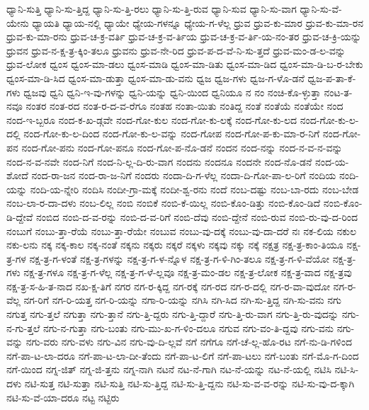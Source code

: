 {ಧ್ಯಾನಿ-ಸುತ್ತಿ
ಧ್ಯಾನಿ-ಸು-ತ್ತಿದ್ದ
ಧ್ಯಾನಿ-ಸು-ತ್ತಿ-ರಲು
ಧ್ಯಾನಿ-ಸು-ತ್ತಿ-ರುವ
ಧ್ಯಾನಿ-ಸುವ
ಧ್ಯಾನಿ-ಸು-ವಾಗ
ಧ್ಯಾನಿ-ಸು-ವೆ-ಯೇನು
ಧ್ಯಾಯತಿ
ಧ್ಯಾಯ-ನಲ್ಲಿ
ಧ್ಯಾಯೇ
ಧ್ಯೇಯ-ಗಳನ್ನೂ
ಧ್ಯೇಯ-ಗ-ಳೆಲ್ಲ
ಧ್ರುವ
ಧ್ರುವ-ಕು-ಮಾರ
ಧ್ರುವ-ಕು-ಮಾ-ರನ
ಧ್ರುವ-ಕು-ಮಾ-ರನು
ಧ್ರುವ-ಚ-ಕ್ರ-ವರ್ತಿ
ಧ್ರುವ-ಚ-ಕ್ರ-ವ-ರ್ತಿಯ
ಧ್ರುವ-ಚ-ಕ್ರ-ವ-ರ್ತಿ-ಯ-ನಂ-ತರ
ಧ್ರುವ-ಚ-ಕ್ರಿ-ಯನ್ನು
ಧ್ರುವನ
ಧ್ರುವ-ನ-ಕ್ಷ-ತ್ರ-ಕ್ಕಿಂ-ತಲೂ
ಧ್ರುವನು
ಧ್ರುವ-ನೇ-ರಿದ
ಧ್ರುವ-ಪ-ದ-ವೆ-ನಿ-ಸು-ತ್ತದೆ
ಧ್ರುವ-ಮಂ-ಡ-ಲ-ವನ್ನು
ಧ್ರುವ-ಲೋಕ
ಧ್ವಂಸ
ಧ್ವಂಸ-ಮಾ-ಡಲು
ಧ್ವಂಸ-ಮಾಡಿ
ಧ್ವಂಸ-ಮಾ-ಡಿತು
ಧ್ವಂಸ-ಮಾ-ಡಿದ
ಧ್ವಂಸ-ಮಾ-ಡಿ-ಬ-ರ-ಬೇಕು
ಧ್ವಂಸ-ಮಾ-ಡಿ-ಸಿದ
ಧ್ವಂಸ-ಮಾ-ಡುತ್ತಾ
ಧ್ವಂಸ-ಮಾ-ಡು-ವನು
ಧ್ವಜ
ಧ್ವಜ-ಗಳು
ಧ್ವಜ-ಗ-ಳೊ-ಡನೆ
ಧ್ವಜ-ಪ-ತಾ-ಕೆ-ಗಳು
ಧ್ವಜವು
ಧ್ವನಿ
ಧ್ವನಿ-ಇ-ವು-ಗಳನ್ನು
ಧ್ವನಿ-ಯನ್ನು
ಧ್ವನಿ-ಯಿಂದ
ಧ್ವನಿಯೂ
ನ
ನಂ
ನಂಚಿ-ಕೊ-ಳ್ಳುತ್ತಾ
ನಂಟ-ತ-ನವೂ
ನಂತರ
ನಂತ-ರದ
ನಂತ-ರ-ದ-ವ-ರೆಗೂ
ನಂತಹ
ನಂತಾ-ಯಿತು
ನಂತಿದ್ದ
ನಂತೆ
ನಂತೆಯೆ
ನಂತೆಯೇ
ನಂದ
ನಂದ-ಇ-ಬ್ಬರೂ
ನಂದ-ಕ-ಖ-ಡ್ಗವೇ
ನಂದ-ಗೋ-ಕುಲ
ನಂದ-ಗೋ-ಕು-ಲಕ್ಕೆ
ನಂದ-ಗೋ-ಕು-ಲದ
ನಂದ-ಗೋ-ಕು-ಲ-ದಲ್ಲಿ
ನಂದ-ಗೋ-ಕು-ಲ-ದಿಂದ
ನಂದ-ಗೋ-ಕು-ಲ-ವನ್ನು
ನಂದ-ಗೋಪ
ನಂದ-ಗೋ-ಪ-ಕು-ಮಾ-ರ-ನಿಗೆ
ನಂದ-ಗೋ-ಪನ
ನಂದ-ಗೋ-ಪನು
ನಂದ-ಗೋ-ಪನೂ
ನಂದ-ಗೋ-ಪ-ನೊ-ಡನೆ
ನಂದನ
ನಂದ-ನನ್ನು
ನಂದ-ನ-ವ-ನ-ವನ್ನು
ನಂದ-ನ-ವ-ನವೇ
ನಂದ-ನಿಗೆ
ನಂದ-ನಿ-ಲ್ಲ-ದಿ-ರು-ವಾಗ
ನಂದನು
ನಂದನೂ
ನಂದನೇ
ನಂದ-ನೊ-ಡನೆ
ನಂದ-ಯ-ಶೋದೆ
ನಂದ-ರಾ-ಜನ
ನಂದ-ರಾ-ಜ-ನಿಗೆ
ನಂದರು
ನಂದಾ-ದಿ-ಗ-ಳೆಲ್ಲ
ನಂದಾ-ದಿ-ಗೋ-ಪಾ-ಲ-ರಿಗೆ
ನಂದಿಯ
ನಂದಿ-ಯನ್ನು
ನಂದಿ-ಯ-ನ್ನೇರಿ
ನಂದಿಸಿ
ನಂದೀ-ಗ್ರಾ-ಮಕ್ಕೆ
ನಂದೀ-ಶ್ವ-ರನು
ನಂದೆ
ನಂಬ-ದಷ್ಟು
ನಂಬ-ಬಾ-ರದು
ನಂಬ-ಬೇಡ
ನಂಬ-ಲಾ-ರ-ದಾ-ದಳು
ನಂಬ-ಲಿಲ್ಲ
ನಂಬಿ
ನಂಬಿಕೆ
ನಂಬಿ-ಕೆ-ಯಿಲ್ಲ
ನಂಬಿ-ಕೊಂ-ಡಿತ್ತು
ನಂಬಿ-ಕೊಂ-ಡಿದೆ
ನಂಬಿ-ಕೊಂ-ಡಿ-ದ್ದೇವೆ
ನಂಬಿದ
ನಂಬಿ-ದ-ವ-ರನ್ನು
ನಂಬಿ-ದ-ವ-ರಿಗೆ
ನಂಬಿ-ದೆವು
ನಂಬಿ-ದ್ದೇನೆ
ನಂಬಿ-ರುವ
ನಂಬಿ-ರು-ವು-ದ-ರಿಂದ
ನಂಬುಗೆ
ನಂಬು-ತ್ತಾ-ರೆಯೆ
ನಂಬು-ತ್ತಾ-ರೆಯೇ
ನಂಬುವ
ನಂಬು-ವು-ದಕ್ಕೆ
ನಂಬು-ವು-ದಾ-ದರೆ
ನಃ
ನಕ-ಲಿಯ
ನಕುಲ
ನಕು-ಲನು
ನಕ್ಕ
ನಕ್ಕ-ಕಾಲ
ನಕ್ಕ-ನಂತೆ
ನಕ್ಕನು
ನಕ್ಕರು
ನಕ್ಕರೆ
ನಕ್ಕಳು
ನಕ್ಕವು
ನಕ್ಕು
ನಕ್ಕೆ
ನಕ್ಷತ್ರ
ನಕ್ಷ-ತ್ರ-ಕಾಂ-ತಿಯೂ
ನಕ್ಷ-ತ್ರ-ಗಳ
ನಕ್ಷ-ತ್ರ-ಗ-ಳಂತೆ
ನಕ್ಷ-ತ್ರ-ಗಳನ್ನು
ನಕ್ಷ-ತ್ರ-ಗ-ಳ-ನ್ನೊಳ
ನಕ್ಷ-ತ್ರ-ಗ-ಳಿ-ಗಿಂ-ತಲೂ
ನಕ್ಷ-ತ್ರ-ಗ-ಳಿ-ವೆಯೋ
ನಕ್ಷ-ತ್ರ-ಗಳು
ನಕ್ಷ-ತ್ರ-ಗಳೂ
ನಕ್ಷ-ತ್ರ-ಗ-ಳೆಲ್ಲ
ನಕ್ಷ-ತ್ರ-ಗ-ಳೆ-ಲ್ಲವೂ
ನಕ್ಷ-ತ್ರ-ಮಂ-ಡಲ
ನಕ್ಷ-ತ್ರ-ಲೋಕ
ನಕ್ಷ-ತ್ರ-ವಾದ
ನಕ್ಷ-ತ್ರವು
ನಕ್ಷ-ತ್ರ-ಸ-ಹಿ-ತ-ನಾದ
ನಖ-ಕ್ಷ-ತಿಗೆ
ನಗರ
ನಗ-ರ-ಕ್ಕಿದ್ದ
ನಗ-ರಕ್ಕೆ
ನಗ-ರದ
ನಗ-ರ-ದಲ್ಲಿ
ನಗ-ರ-ವಾ-ವುದೋ
ನಗ-ರ-ವೆಲ್ಲ
ನಗ-ರಿಗೆ
ನಗ-ರಿ-ಯತ್ತ
ನಗ-ರಿ-ಯನ್ನು
ನಗಾ-ರಿ-ಯನ್ನು
ನಗಿಸಿ
ನಗಿ-ಸಿದ
ನಗಿ-ಸು-ತ್ತಿದ್ದ
ನಗಿ-ಸು-ವನು
ನಗು
ನಗುತ್ತ
ನಗು-ತ್ತಲೆ
ನಗುತ್ತಾ
ನಗು-ತ್ತಾನೆ
ನಗು-ತ್ತಿ-ದ್ದರು
ನಗು-ತ್ತಿ-ದ್ದಾರೆ
ನಗು-ತ್ತಿ-ರು-ವಾಗ
ನಗು-ತ್ತಿ-ರು-ವುದನ್ನು
ನಗು-ನ-ಗು-ತ್ತಲೆ
ನಗು-ನ-ಗುತ್ತಾ
ನಗು-ಬಂತು
ನಗು-ಮು-ಖ-ಗ-ಳಿಂ-ದಲೂ
ನಗುವ
ನಗು-ವಂ-ತಿ-ದ್ದವು
ನಗು-ವನು
ನಗು-ವನ್ನು
ನಗು-ವರು
ನಗು-ವಳು
ನಗು-ವಿನ
ನಗು-ವು-ದಿ-ಲ್ಲವೆ
ನಗೆ
ನಗೆಗೂ
ನಗೆ-ಚೆ-ಲ್ಲ-ಹೊ-ರಟ
ನಗೆ-ನು-ಡಿ-ಗಳಿಂದ
ನಗೆ-ಪಾ-ಟ-ಲಾ-ದರೂ
ನಗೆ-ಪಾ-ಟ-ಲಾ-ದೀ-ತೆಂದು
ನಗೆ-ಪಾ-ಟ-ಲಿಗೆ
ನಗೆ-ಪಾ-ಟಲು
ನಗೆ-ಬಂತು
ನಗೆ-ಮೊ-ಗ-ದಿಂದ
ನಗೆ-ಯಿಂದ
ನಗ್ನ-ಜಿತ್
ನಗ್ನ-ಜಿ-ತ್ತನು
ನಗ್ನ-ನಾಗಿ
ನಟನೆ
ನಟ-ನೆ-ಗಾಗಿ
ನಟ-ನೆ-ಯನ್ನು
ನಟ-ನೆ-ಯಲ್ಲಿ
ನಟಿಸಿ
ನಟಿ-ಸಿ-ದಳು
ನಟಿ-ಸುತ್ತ
ನಟಿ-ಸುತ್ತಾ
ನಟಿ-ಸುತ್ತಿ
ನಟಿ-ಸು-ತ್ತಿದ್ದ
ನಟಿ-ಸು-ತ್ತಿ-ದ್ದನು
ನಟಿ-ಸು-ವ-ವ-ರನ್ನು
ನಟಿ-ಸು-ವು-ದ-ಕ್ಕಾಗಿ
ನಟಿ-ಸು-ವೆ-ಯಾ-ದರೂ
ನಟ್ಟ
ನಟ್ಟಿರು
}
